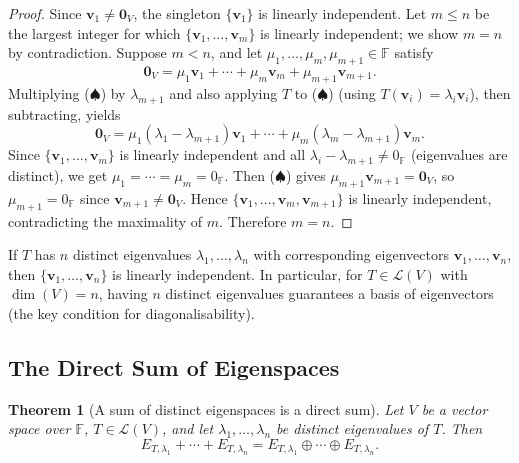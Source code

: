 \documentclass[11pt, a4paper, notitlepage]{report}
\newtheorem{theorem}{Theorem}[section]
\theoremstyle{definition}
\theoremstyle{remark}
\begin{document}
\begin{proof}
Since $\mathbf{v}_1 \neq \mathbf{0}_V$, the singleton $\{\mathbf{v}_1\}$ is linearly
independent. Let $m \leq n$ be the largest integer for which $\{\mathbf{v}_1, \ldots,
\mathbf{v}_m\}$ is linearly independent; we show $m = n$ by contradiction. Suppose $m < n$,
and let $\mu_1, \ldots, \mu_m, \mu_{m+1} \in \mathbb{F}$ satisfy
\[
  \mathbf{0}_V = \mu_1\mathbf{v}_1 + \cdots + \mu_m\mathbf{v}_m + \mu_{m+1}\mathbf{v}_{m+1}.
  \tag{$\spadesuit$}
\]
Multiplying ($\spadesuit$) by $\lambda_{m+1}$ and also applying $T$ to ($\spadesuit$) (using
$T(\mathbf{v}_i) = \lambda_i\mathbf{v}_i$), then subtracting, yields
\[
  \mathbf{0}_V = \mu_1(\lambda_1 - \lambda_{m+1})\mathbf{v}_1 + \cdots
  + \mu_m(\lambda_m - \lambda_{m+1})\mathbf{v}_m.
\]
Since $\{\mathbf{v}_1, \ldots, \mathbf{v}_m\}$ is linearly independent and all $\lambda_i -
\lambda_{m+1} \neq 0_{\mathbb{F}}$ (eigenvalues are distinct), we get $\mu_1 = \cdots =
\mu_m = 0_{\mathbb{F}}$. Then ($\spadesuit$) gives $\mu_{m+1}\mathbf{v}_{m+1} = \mathbf{0}_V$,
so $\mu_{m+1} = 0_{\mathbb{F}}$ since $\mathbf{v}_{m+1} \neq \mathbf{0}_V$. Hence
$\{\mathbf{v}_1, \ldots, \mathbf{v}_m, \mathbf{v}_{m+1}\}$ is linearly independent,
contradicting the maximality of $m$. Therefore $m = n$.
\end{proof}

\begin{keyresult}[title={Key Result: Distinct Eigenvalues Give Linearly Independent Eigenvectors}]
If $T$ has $n$ distinct eigenvalues $\lambda_1, \ldots, \lambda_n$ with corresponding
eigenvectors $\mathbf{v}_1, \ldots, \mathbf{v}_n$, then $\{\mathbf{v}_1, \ldots,
\mathbf{v}_n\}$ is linearly independent. In particular, for $T \in \mathcal{L}(V)$ with
$\dim(V) = n$, having $n$ distinct eigenvalues guarantees a basis of eigenvectors (the key
condition for diagonalisability).
\end{keyresult}

\subsection{The Direct Sum of Eigenspaces}

\begin{theorem}[A sum of distinct eigenspaces is a direct sum]\label{thm:eigenspace-direct-sum}
Let $V$ be a vector space over $\mathbb{F}$, $T \in \mathcal{L}(V)$, and let $\lambda_1,
\ldots, \lambda_n$ be distinct eigenvalues of $T$. Then
\[
  E_{T,\lambda_1} + \cdots + E_{T,\lambda_n}
  = E_{T,\lambda_1} \oplus \cdots \oplus E_{T,\lambda_n}.
\]
\end{theorem}
\end{document}
